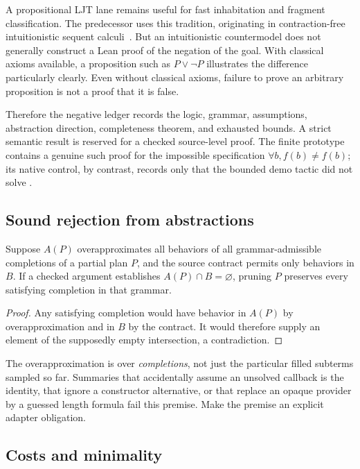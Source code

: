 A propositional LJT lane remains useful for fast inhabitation and fragment classification. The predecessor uses this tradition, originating in contraction-free intuitionistic sequent calculi~\cite{djex,dyckhoff}. But an intuitionistic countermodel does not generally construct a Lean proof of the negation of the goal. With classical axioms available, a proposition such as $P\lor\neg P$ illustrates the difference particularly clearly. Even without classical axioms, failure to prove an arbitrary proposition is not a proof that it is false.

Therefore the negative ledger records the logic, grammar, assumptions, abstraction direction, completeness theorem, and exhausted bounds. A strict semantic  result is reserved for a checked source-level proof. The finite prototype contains a genuine such proof for the impossible specification $\forall b, f(b)\ne f(b)$; its native  control, by contrast, records only that the bounded demo tactic did not solve .

\subsection{Sound rejection from abstractions}

\begin{proposition}
Suppose $A(P)$ overapproximates all behaviors of all grammar-admissible completions of a partial plan $P$, and the source contract permits only behaviors in $B$. If a checked argument establishes $A(P)\cap B=\varnothing$, pruning $P$ preserves every satisfying completion in that grammar.
\end{proposition}
\begin{proof}
Any satisfying completion would have behavior in $A(P)$ by overapproximation and in $B$ by the contract. It would therefore supply an element of the supposedly empty intersection, a contradiction.
\end{proof}

The overapproximation is over \emph{completions}, not just the particular filled subterms sampled so far. Summaries that accidentally assume an unsolved callback is the identity, that ignore a constructor alternative, or that replace an opaque provider by a guessed length formula fail this premise. Make the premise an explicit adapter obligation.

\subsection{Costs and minimality}

